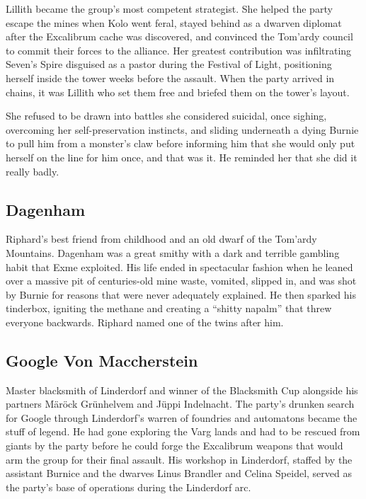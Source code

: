 Lillith became the group's most competent strategist.  She helped the party escape the mines when Kolo went feral, stayed behind as a dwarven diplomat after the Excalibrum cache was discovered, and convinced the Tom'ardy council to commit their forces to the alliance.  Her greatest contribution was infiltrating Seven's Spire disguised as a pastor during the Festival of Light, positioning herself inside the tower weeks before the assault.  When the party arrived in chains, it was Lillith who set them free and briefed them on the tower's layout.

She refused to be drawn into battles she considered suicidal, once sighing, overcoming her self-preservation instincts, and sliding underneath a dying Burnie to pull him from a monster's claw before informing him that she would only put herself on the line for him once, and that was it.  He reminded her that she did it really badly.

\smallskip

\subsection*{Dagenham}

\noindent

Riphard's best friend from childhood and an old dwarf of the Tom'ardy Mountains.  Dagenham was a great smithy with a dark and terrible gambling habit that Exme exploited.  His life ended in spectacular fashion when he leaned over a massive pit of centuries-old mine waste, vomited, slipped in, and was shot by Burnie for reasons that were never adequately explained.  He then sparked his tinderbox, igniting the methane and creating a ``shitty napalm'' that threw everyone backwards.  Riphard named one of the twins after him.

\smallskip

\subsection*{Google Von Maccherstein}

\noindent

Master blacksmith of Linderdorf and winner of the Blacksmith Cup alongside his partners M\"ar\"ock Gr\"unhelvem and J\"uppi Indelnacht.  The party's drunken search for Google through Linderdorf's warren of foundries and automatons became the stuff of legend.  He had gone exploring the Varg lands and had to be rescued from giants by the party before he could forge the Excalibrum weapons that would arm the group for their final assault.  His workshop in Linderdorf, staffed by the assistant Burnice and the dwarves Linus Brandler and Celina Speidel, served as the party's base of operations during the Linderdorf arc.

